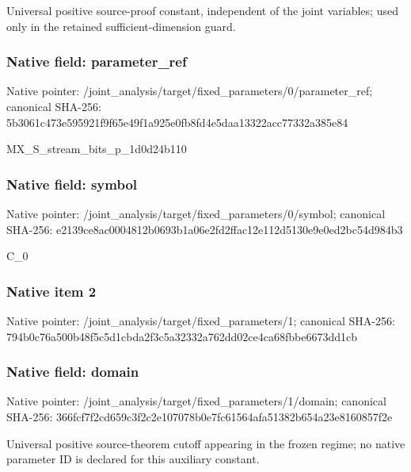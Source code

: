 \documentclass[10pt,a4paper]{article}
\begin{document}
\begingroup\raggedright\sloppy Universal positive source-proof constant,\allowbreak{} independent of the joint variables;\allowbreak{} used only in the retained sufficient-dimension guard.\par\endgroup

\subsubsection{Native field: parameter\_\allowbreak{}ref}
Native pointer: /joint\_\allowbreak{}analysis/target/fixed\_\allowbreak{}parameters/0/parameter\_\allowbreak{}ref; canonical SHA-256: 5b3061c473e595921f9f65e49f1a925e0fb8fd4e5daa13322acc77332a385e84

\begingroup\raggedright\sloppy MX\_\allowbreak{}S\_\allowbreak{}stream\_\allowbreak{}bits\_\allowbreak{}p\_\allowbreak{}1d0d24b110\par\endgroup

\subsubsection{Native field: symbol}
Native pointer: /joint\_\allowbreak{}analysis/target/fixed\_\allowbreak{}parameters/0/symbol; canonical SHA-256: e2139ce8ac0004812b0693b1a06e2fd2ffac12e112d5130e9e0ed2bc54d984b3

\begingroup\raggedright\sloppy C\_\allowbreak{}0\par\endgroup

\subsubsection{Native item 2}
Native pointer: /joint\_\allowbreak{}analysis/target/fixed\_\allowbreak{}parameters/1; canonical SHA-256: 794b0c76a500b48f5c5d1cbda2f3c5a32332a762dd02ce4ca68fbbe6673dd1cb

\subsubsection{Native field: domain}
Native pointer: /joint\_\allowbreak{}analysis/target/fixed\_\allowbreak{}parameters/1/domain; canonical SHA-256: 366fcf7f2cd659c3f2c2e107078b0e7fc61564afa51382b654a23e8160857f2e

\begingroup\raggedright\sloppy Universal positive source-theorem cutoff appearing in the frozen regime;\allowbreak{} no native parameter ID is declared for this auxiliary constant.\par\endgroup
\end{document}
